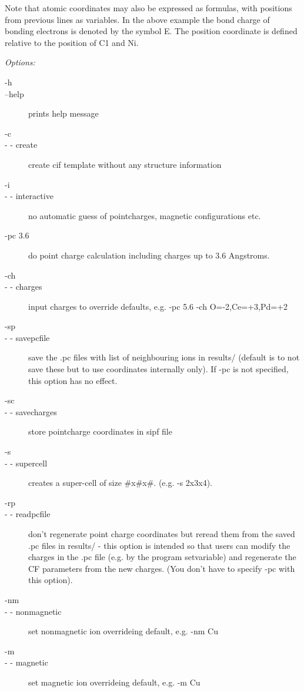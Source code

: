 \begin{description}
Note that atomic coordinates may also be expressed as formulas, with positions
from previous lines as variables. In the above example the bond charge of bonding 
electrons is denoted by the symbol E. The position coordinate is defined relative
to the position of C1 and Ni. 

{\em Options:}
\begin{description}
\item[ -h ]
 \item[--help] prints help message
 \item[-c]
\item[- - create]  create cif template without any structure information
\item[-i]
\item[- - interactive] no automatic guess of pointcharges, magnetic configurations etc. 
\item[-pc 3.6] do point charge calculation including charges up to 3.6 Angstroms.
\item[-ch]
\item[- - charges] input charges to override defaults, e.g. -pc 5.6 -ch O=-2,Ce=+3,Pd=+2
\item[-sp       ] 
\item[- - savepcfile] save the .pc files with list of neighbouring ions in results/ (default is to not save these but to use coordinates internally only). If -pc is not specified, this option has no effect.
\item[-sc       ] 
\item[- - savecharges ]store pointcharge coordinates in sipf file
\item[-s       ] 
\item[- - supercell] creates a super-cell of size \#x\#x\#. (e.g. -s 2x3x4).
\item[-rp        ] 
\item[- - readpcfile] don't regenerate point charge coordinates but reread them from 
the saved .pc files in results/ - this option is intended so that users can 
modify the charges in the .pc file (e.g. by the program {\prg setvariable})
 and regenerate the CF parameters 
from the new charges. (You don't have to specify -pc with this option).
\item[-nm]\item[- - nonmagnetic]  set nonmagnetic ion overrideing default, e.g. -nm Cu
   \item[-m] \item[- - magnetic]  set magnetic ion overrideing default, e.g. -m Cu
    

\end{description}
\end{description}
